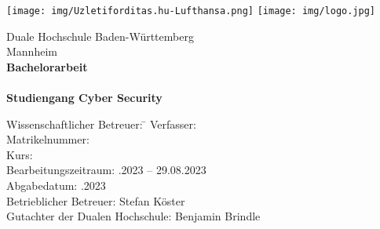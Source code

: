 \begin{titlepage}
    \begin{minipage}{\textwidth}
            \vspace{-2cm}
            \noindent
            \texttt{[image: img/Uzletiforditas.hu-Lufthansa.png]} 
             \hfill   
             \texttt{[image: img/logo.jpg]}
    \end{minipage}
    
    \vspace{2em}
    \sffamily
    \begin{center}
        \textsf{\large{}Duale Hochschule Baden-W\"urttemberg\\[1.5mm] Mannheim}\\[2em]
        \textsf{\textbf{\Large{}Bachelorarbeit}}\\[3mm]
        \vspace{5em}
        \textsf{\textbf{\Large{\DerTitelDerArbeit}}} \\[1.5cm]
        \vspace{5em}
        \textsf{\textbf{Studiengang Cyber Security}\\[3mm]}
        
        \vspace{2em}
    \vfill
    
    \begin{minipage}{\textwidth}
    
    \begin{tabbing}
        Wissenschaftlicher Betreuer: \hspace{1.5cm}\=\kill
        Verfasser: \> \DerAutorDerArbeit \\[1.5mm]
        Matrikelnummer:  \\[1.5mm]
        Kurs: \> \DieKursbezeichnung \\[1.5mm]
        Bearbeitungszeitraum: .2023 -- 29.08.2023\\ [1.5mm]
        Abgabedatum: .2023\\ [1.5mm]
        Betrieblicher Betreuer: \> Stefan Köster\\ [1.5mm]
        Gutachter der Dualen Hochschule: \> Benjamin Brindle\\
    \end{tabbing}
    
    \end{minipage}
    
    \end{center}
    
    \end{titlepage}